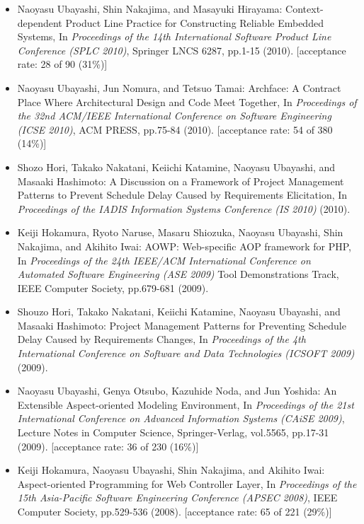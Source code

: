 \documentclass{jarticle}
\begin{document}
\begin{itemize}
\item Naoyasu Ubayashi, Shin Nakajima, and Masayuki Hirayama:
Context-dependent Product Line Practice for Constructing Reliable Embedded Systems,
In {\em Proceedings of the 14th International Software Product Line Conference (SPLC 2010)},
Springer LNCS 6287, pp.1-15 (2010).
[acceptance rate: 28 of 90 (31\%)]

\item Naoyasu Ubayashi, Jun Nomura, and Tetsuo Tamai:
Archface: A Contract Place Where Architectural Design and Code Meet Together,
In {\em Proceedings of the 32nd ACM/IEEE International Conference on Software Engineering (ICSE 2010)},
ACM PRESS, pp.75-84 (2010).
[acceptance rate: 54 of 380 (14\%)]

\item Shozo Hori, Takako Nakatani, Keiichi Katamine, Naoyasu Ubayashi, and Masaaki Hashimoto:
A Discussion on a Framework of Project Management Patterns to Prevent Schedule Delay Caused by  Requirements Elicitation,
In {\em Proceedings of the IADIS Information Systems Conference (IS 2010)} (2010).

\item Keiji Hokamura, Ryoto Naruse, Masaru Shiozuka, Naoyasu Ubayashi, Shin Nakajima, and Akihito Iwai:
AOWP: Web-specific AOP framework for PHP,
In {\em Proceedings of the 24th IEEE/ACM International Conference on Automated Software Engineering (ASE 2009)} Tool Demonstrations Track,
IEEE Computer Society, pp.679-681 (2009).

\item Shouzo Hori, Takako Nakatani, Keiichi Katamine, Naoyasu Ubayashi, and Masaaki Hashimoto:
Project Management Patterns for Preventing Schedule Delay Caused by Requirements Changes,
In {\em Proceedings of the 4th International Conference on Software and Data Technologies (ICSOFT 2009)} (2009).

\item Naoyasu Ubayashi, Genya Otsubo, Kazuhide Noda, and Jun Yoshida:
An Extensible Aspect-oriented Modeling Environment,
In {\em Proceedings of the 21st International Conference on Advanced Information Systems (CAiSE 2009)},
Lecture Notes in Computer Science, Springer-Verlag, vol.5565, pp.17-31 (2009).
[acceptance rate: 36 of 230 (16\%)]

\item Keiji Hokamura, Naoyasu Ubayashi, Shin Nakajima, and Akihito Iwai:
Aspect-oriented Programming for Web Controller Layer,
In {\em Proceedings of the 15th Asia-Pacific Software Engineering Conference (APSEC 2008)},
IEEE Computer Society,
pp.529-536 (2008).
[acceptance rate: 65 of 221 (29\%)]


\end{itemize}
\end{document}

